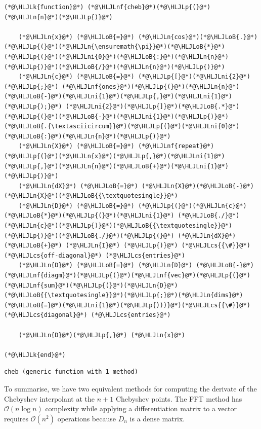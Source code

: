 \documentclass[12pt,a4paper]{article}
\newcommand{\HLJLk}[1]{\textcolor[RGB]{148,91,176}{\textbf{#1}}}
\newcommand{\HLJLn}[1]{#1}
\newcommand{\HLJLnf}[1]{\textcolor[RGB]{66,102,213}{#1}}
\newcommand{\HLJLni}[1]{\textcolor[RGB]{59,151,46}{#1}}
\newcommand{\HLJLoB}[1]{\textcolor[RGB]{102,102,102}{\textbf{#1}}}
\newcommand{\HLJLp}[1]{#1}
\newcommand{\HLJLcs}[1]{\textcolor[RGB]{153,153,119}{\textit{#1}}}
\begin{document}
\begin{lstlisting}
(*@\HLJLk{function}@*) (*@\HLJLnf{cheb}@*)(*@\HLJLp{(}@*)(*@\HLJLn{n}@*)(*@\HLJLp{)}@*)

    (*@\HLJLn{x}@*) (*@\HLJLoB{=}@*) (*@\HLJLn{cos}@*)(*@\HLJLoB{.}@*)(*@\HLJLp{(}@*)(*@\HLJLn{\ensuremath{\pi}}@*)(*@\HLJLoB{*}@*)(*@\HLJLp{(}@*)(*@\HLJLni{0}@*)(*@\HLJLoB{:}@*)(*@\HLJLn{n}@*)(*@\HLJLp{)}@*)(*@\HLJLoB{/}@*)(*@\HLJLn{n}@*)(*@\HLJLp{)}@*)
    (*@\HLJLn{c}@*) (*@\HLJLoB{=}@*) (*@\HLJLp{[}@*)(*@\HLJLni{2}@*)(*@\HLJLp{;}@*) (*@\HLJLnf{ones}@*)(*@\HLJLp{(}@*)(*@\HLJLn{n}@*)(*@\HLJLoB{-}@*)(*@\HLJLni{1}@*)(*@\HLJLp{,}@*)(*@\HLJLni{1}@*)(*@\HLJLp{);}@*) (*@\HLJLni{2}@*)(*@\HLJLp{]}@*)(*@\HLJLoB{.*}@*)(*@\HLJLp{(}@*)(*@\HLJLoB{-}@*)(*@\HLJLni{1}@*)(*@\HLJLp{)}@*)(*@\HLJLoB{.{\textasciicircum}}@*)(*@\HLJLp{(}@*)(*@\HLJLni{0}@*)(*@\HLJLoB{:}@*)(*@\HLJLn{n}@*)(*@\HLJLp{)}@*)
    (*@\HLJLn{X}@*) (*@\HLJLoB{=}@*) (*@\HLJLnf{repeat}@*)(*@\HLJLp{(}@*)(*@\HLJLn{x}@*)(*@\HLJLp{,}@*)(*@\HLJLni{1}@*)(*@\HLJLp{,}@*)(*@\HLJLn{n}@*)(*@\HLJLoB{+}@*)(*@\HLJLni{1}@*)(*@\HLJLp{)}@*)
    (*@\HLJLn{dX}@*) (*@\HLJLoB{=}@*) (*@\HLJLn{X}@*)(*@\HLJLoB{-}@*)(*@\HLJLn{X}@*)(*@\HLJLoB{{\textquotesingle}}@*)
    (*@\HLJLn{D}@*) (*@\HLJLoB{=}@*) (*@\HLJLp{(}@*)(*@\HLJLn{c}@*)(*@\HLJLoB{*}@*)(*@\HLJLp{(}@*)(*@\HLJLni{1}@*) (*@\HLJLoB{./}@*)(*@\HLJLn{c}@*)(*@\HLJLp{)}@*)(*@\HLJLoB{{\textquotesingle}}@*)(*@\HLJLp{)}@*)(*@\HLJLoB{./}@*)(*@\HLJLp{(}@*) (*@\HLJLn{dX}@*) (*@\HLJLoB{+}@*) (*@\HLJLn{I}@*) (*@\HLJLp{)}@*) (*@\HLJLcs{{\#}}@*) (*@\HLJLcs{off-diagonal}@*) (*@\HLJLcs{entries}@*)
    (*@\HLJLn{D}@*) (*@\HLJLoB{=}@*) (*@\HLJLn{D}@*) (*@\HLJLoB{-}@*) (*@\HLJLnf{diagm}@*)(*@\HLJLp{(}@*)(*@\HLJLnf{vec}@*)(*@\HLJLp{(}@*)(*@\HLJLnf{sum}@*)(*@\HLJLp{(}@*)(*@\HLJLn{D}@*)(*@\HLJLoB{{\textquotesingle}}@*)(*@\HLJLp{;}@*)(*@\HLJLn{dims}@*)(*@\HLJLoB{=}@*)(*@\HLJLni{1}@*)(*@\HLJLp{)))}@*)(*@\HLJLcs{{\#}}@*) (*@\HLJLcs{diagonal}@*) (*@\HLJLcs{entries}@*)
    
    (*@\HLJLn{D}@*)(*@\HLJLp{,}@*) (*@\HLJLn{x}@*)

(*@\HLJLk{end}@*)
\end{lstlisting}

\begin{lstlisting}
cheb (generic function with 1 method)
\end{lstlisting}


To summarise, we have two equivalent methods for computing the derivate of the Chebyshev interpolant at the $n+1$ Chebyshev points.  The FFT method has $\mathcal{O}(n\log n)$ complexity while  applying a differentiation matrix to a vector requires $\mathcal{O}(n^2)$ operations because $D_n$ is a dense matrix.
\end{document}
